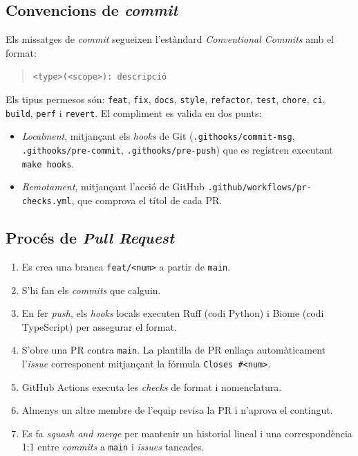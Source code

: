 \subsection{Convencions de \emph{commit}}

Els missatges de \emph{commit} segueixen l'estàndard \emph{Conventional
Commits} \cite{conventionalcommits} amb el format:

\begin{quote}
\texttt{<type>(<scope>): descripció}
\end{quote}

Els tipus permesos són: \texttt{feat}, \texttt{fix}, \texttt{docs},
\texttt{style}, \texttt{refactor}, \texttt{test}, \texttt{chore},
\texttt{ci}, \texttt{build}, \texttt{perf} i \texttt{revert}. El compliment
es valida en dos punts:

\begin{itemize}
    \item \emph{Localment}, mitjançant els \emph{hooks} de Git
    (\texttt{.githooks/commit-msg}, \texttt{.githooks/pre-commit},
    \texttt{.githooks/pre-push}) que es registren executant
    \texttt{make hooks}.

    \item \emph{Remotament}, mitjançant l'acció de GitHub
    \texttt{.github/workflows/pr-checks.yml}, que comprova el títol de cada
    \ac{PR}.
\end{itemize}

\subsection{Procés de \emph{Pull Request}}

\begin{enumerate}
    \item Es crea una branca \texttt{feat/<num>} a partir de \texttt{main}.
    \item S'hi fan els \emph{commits} que calguin.
    \item En fer \emph{push}, els \emph{hooks} locals executen Ruff (codi
    Python) i Biome (codi TypeScript) per assegurar el format.
    \item S'obre una \ac{PR} contra \texttt{main}. La plantilla de \ac{PR}
    enllaça automàticament l'\emph{issue} corresponent mitjançant la
    fórmula \texttt{Closes \#<num>}.
    \item GitHub Actions executa les \emph{checks} de format i nomenclatura.
    \item Almenys un altre membre de l'equip revisa la \ac{PR} i n'aprova
    el contingut.
    \item Es fa \emph{squash and merge} per mantenir un historial lineal i
    una correspondència 1:1 entre \emph{commits} a \texttt{main} i
    \emph{issues} tancades.
\end{enumerate}

